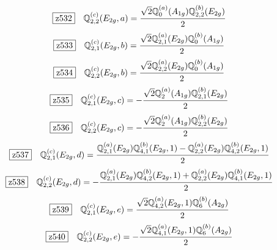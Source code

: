 \documentclass[fleqn,10pt,landscape]{jsarticle}
\begin{document}
\begin{dmath*}
\hspace*{3mm}\fbox{z532}\quad \mathbb{Q}_{2,2}^{(c)}(E_{2g},a)=\frac{\sqrt{2} \mathbb{Q}_{0}^{(a)}(A_{1g}) \mathbb{Q}_{2,2}^{(b)}(E_{2g})}{2}
\end{dmath*}
\begin{dmath*}
\hspace*{3mm}\fbox{z533}\quad \mathbb{Q}_{2,1}^{(c)}(E_{2g},b)=\frac{\sqrt{2} \mathbb{Q}_{2,1}^{(a)}(E_{2g}) \mathbb{Q}_{0}^{(b)}(A_{1g})}{2}
\end{dmath*}
\begin{dmath*}
\hspace*{3mm}\fbox{z534}\quad \mathbb{Q}_{2,2}^{(c)}(E_{2g},b)=\frac{\sqrt{2} \mathbb{Q}_{2,2}^{(a)}(E_{2g}) \mathbb{Q}_{0}^{(b)}(A_{1g})}{2}
\end{dmath*}
\begin{dmath*}
\hspace*{3mm}\fbox{z535}\quad \mathbb{Q}_{2,1}^{(c)}(E_{2g},c)=- \frac{\sqrt{2} \mathbb{Q}_{2}^{(a)}(A_{1g}) \mathbb{Q}_{2,1}^{(b)}(E_{2g})}{2}
\end{dmath*}
\begin{dmath*}
\hspace*{3mm}\fbox{z536}\quad \mathbb{Q}_{2,2}^{(c)}(E_{2g},c)=- \frac{\sqrt{2} \mathbb{Q}_{2}^{(a)}(A_{1g}) \mathbb{Q}_{2,2}^{(b)}(E_{2g})}{2}
\end{dmath*}
\begin{dmath*}
\hspace*{3mm}\fbox{z537}\quad \mathbb{Q}_{2,1}^{(c)}(E_{2g},d)=\frac{\mathbb{Q}_{2,1}^{(a)}(E_{2g}) \mathbb{Q}_{4,1}^{(b)}(E_{2g},1) - \mathbb{Q}_{2,2}^{(a)}(E_{2g}) \mathbb{Q}_{4,2}^{(b)}(E_{2g},1)}{2}
\end{dmath*}
\begin{dmath*}
\hspace*{3mm}\fbox{z538}\quad \mathbb{Q}_{2,2}^{(c)}(E_{2g},d)=- \frac{\mathbb{Q}_{2,1}^{(a)}(E_{2g}) \mathbb{Q}_{4,2}^{(b)}(E_{2g},1) + \mathbb{Q}_{2,2}^{(a)}(E_{2g}) \mathbb{Q}_{4,1}^{(b)}(E_{2g},1)}{2}
\end{dmath*}
\begin{dmath*}
\hspace*{3mm}\fbox{z539}\quad \mathbb{Q}_{2,1}^{(c)}(E_{2g},e)=\frac{\sqrt{2} \mathbb{Q}_{4,2}^{(a)}(E_{2g},1) \mathbb{Q}_{6}^{(b)}(A_{2g})}{2}
\end{dmath*}
\begin{dmath*}
\hspace*{3mm}\fbox{z540}\quad \mathbb{Q}_{2,2}^{(c)}(E_{2g},e)=- \frac{\sqrt{2} \mathbb{Q}_{4,1}^{(a)}(E_{2g},1) \mathbb{Q}_{6}^{(b)}(A_{2g})}{2}
\end{dmath*}
\end{document}
